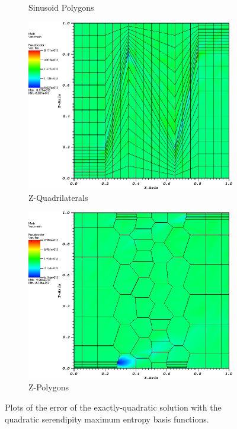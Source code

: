 \begin{figure}
{\begin{subfigure}[b]{0.465\textwidth}
		\caption{Sinusoid Polygons}
	\end{subfigure}
}
{
	\vspace{3mm}
	\begin{subfigure}[b]{0.465\textwidth}
		\centering
		\label{subfig::z_quad_me_k2_lin_sol}
		\includegraphics[width=\textwidth]{figures/sec_BF/quad_err_zquad_ME2.png}
		\caption{Z-Quadrilaterals}
	\end{subfigure}
	\hfill
	\begin{subfigure}[b]{0.465\textwidth}
		\centering
		\label{subfig::z_poly_me_k2_lin_sol}
		\includegraphics[width=\textwidth]{figures/sec_BF/quad_err_zpoly_ME2.png}
		\caption{Z-Polygons}
	\end{subfigure}
}
\caption{Plots of the error of the exactly-quadratic solution with the quadratic serendipity maximum entropy basis functions.}
\label{fig::BF_Results_quad_err_ME2}
\end{figure}

